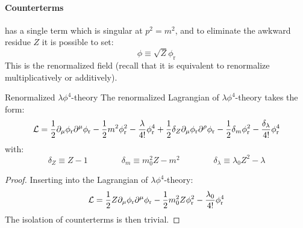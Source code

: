 \paragraph{Counterterms}

 has a single term which is singular at $ p^2 = m^2 $, and to eliminate the awkward residue $ Z $ it is possible to set:
\begin{equation}
  \phi \equiv \sqrt{Z} \phi_\text{r}
  \label{eq:phi-ren}
\end{equation}
This is the renormalized field (recall that it is equivalent to renormalize multiplicatively or additively).

\begin{proposition}{Renormalized $ \lambda \phi^4 $-theory}{}
  The renormalized Lagrangian of $ \lambda \phi^4 $-theory takes the form:
  \begin{equation}
    \mathcal{L} = \frac{1}{2} \partial_\mu \phi_\text{r} \partial^\mu \phi_\text{r} - \frac{1}{2} m^2 \phi_\text{r}^2 - \frac{\lambda}{4!} \phi_\text{r}^4 + \frac{1}{2} \delta_Z \partial_\mu \phi_\text{r} \partial^\rho \phi_\text{r} - \frac{1}{2} \delta_m \phi_\text{r}^2 - \frac{\delta_\lambda}{4!} \phi_\text{r}^4
  \end{equation}
  with:
  \begin{equation}
    \delta_Z \equiv Z - 1
    \qquad \qquad
    \delta_m \equiv m_0^2 Z - m^2
    \qquad \qquad
    \delta_\lambda \equiv \lambda_0 Z^2 - \lambda
  \end{equation}
\end{proposition}

\begin{proofbox}
  \begin{proof}
    Inserting  into the Lagrangian of $ \lambda \phi^4 $-theory:
    \begin{equation*}
      \mathcal{L} = \frac{1}{2} Z \partial_\mu \phi_\text{r} \partial^\mu \phi_\text{r} - \frac{1}{2} m_0^2 Z \phi_\text{r}^2 - \frac{\lambda_0}{4!} \phi_\text{r}^4
    \end{equation*}
    The isolation of counterterms is then trivial.
  \end{proof}
\end{proofbox}

